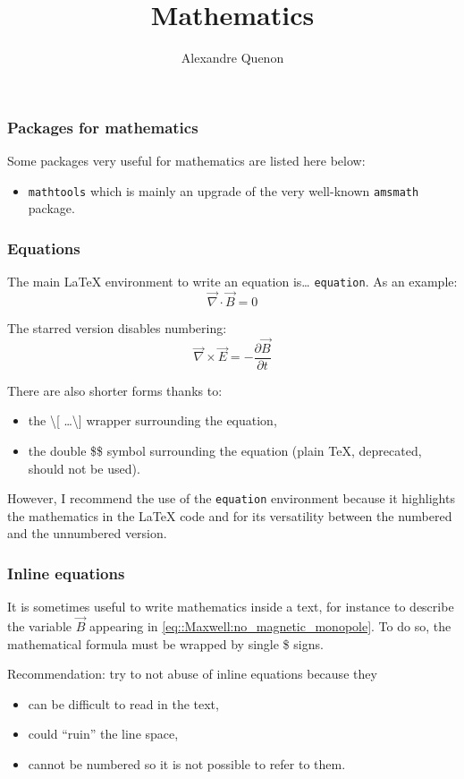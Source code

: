 \documentclass[11pt]{beamer}
\title{Mathematics}
\author[A. Quenon]{Alexandre Quenon}
\begin{document}
\begin{frame}
	\titlepage
\end{frame}


\begin{frame}
	\frametitle{Packages for mathematics}

	Some packages very useful for mathematics are listed here below:
	\begin{itemize}
		\item \texttt{mathtools} which is mainly an upgrade of the very well-known \texttt{amsmath} package.
	\end{itemize}
\end{frame}


\begin{frame}
	\frametitle{Equations}
	
	The main LaTeX environment to write an equation is\dots{} \texttt{equation}.
	As an example:
	\begin{equation}
		\vec{\nabla}\cdot\vec{B}=0
		\label{eq::Maxwell:no_magnetic_monopole}
	\end{equation}
	
	The starred version disables numbering:
	\begin{equation*}
		\vec{\nabla}\times\vec{E}=-\frac{\partial\vec{B}}{\partial t}
	\end{equation*}
	
	There are also shorter forms thanks to:
	\begin{itemize}
		\item the \textbackslash [ \ldots \textbackslash ] wrapper surrounding the equation,
		\item the double \$\$ symbol surrounding the equation (plain \TeX{}, deprecated, should not be used).
	\end{itemize}
	However, I recommend the use of the \texttt{equation} environment because it highlights the mathematics in the \LaTeX{} code and for its versatility between the numbered and the unnumbered version.
\end{frame}


\begin{frame}
	\frametitle{Inline equations}
	
	It is sometimes useful to write mathematics inside a text, for instance to describe the variable $\vec{B}$ appearing in \cref{eq::Maxwell:no_magnetic_monopole}.
	To do so, the mathematical formula must be wrapped by single \$ signs.
	
	Recommendation: try to not abuse of inline equations because they
	\begin{itemize}
		\item can be difficult to read in the text,
		\item could \enquote{ruin} the line space,
		\item cannot be numbered so it is not possible to refer to them.
	\end{itemize}
\end{frame}
\end{document}
